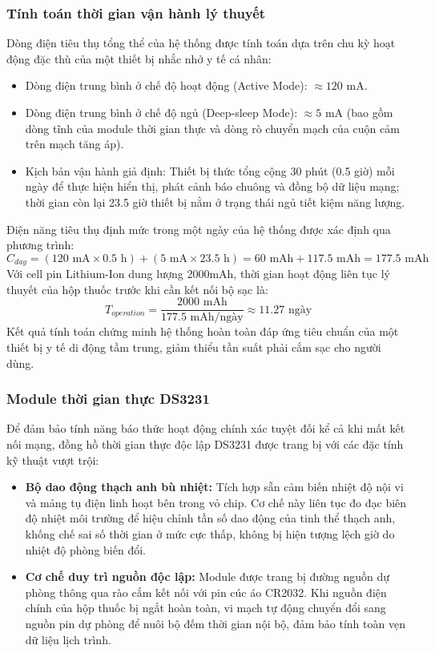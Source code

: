 \documentclass[12pt, a4paper, oneside]{article}
\begin{document}
\subsubsection{Tính toán thời gian vận hành lý thuyết}
Dòng điện tiêu thụ tổng thể của hệ thống được tính toán dựa trên chu kỳ hoạt động đặc thù của một thiết bị nhắc nhở y tế cá nhân:
\begin{itemize}
    \item Dòng điện trung bình ở chế độ hoạt động (Active Mode): $\approx 120$ mA.
    \item Dòng điện trung bình ở chế độ ngủ (Deep-sleep Mode): $\approx 5$ mA (bao gồm dòng tĩnh của module thời gian thực và dòng rò chuyển mạch của cuộn cảm trên mạch tăng áp).
    \item Kịch bản vận hành giả định: Thiết bị thức tổng cộng 30 phút (0.5 giờ) mỗi ngày để thực hiện hiển thị, phát cảnh báo chuông và đồng bộ dữ liệu mạng; thời gian còn lại 23.5 giờ thiết bị nằm ở trạng thái ngủ tiết kiệm năng lượng.
\end{itemize}
Điện năng tiêu thụ định mức trong một ngày của hệ thống được xác định qua phương trình:
\begin{equation}
    C_{day} = (120\text{ mA} \times 0.5\text{ h}) + (5\text{ mA} \times 23.5\text{ h}) = 60\text{ mAh} + 117.5\text{ mAh} = 177.5\text{ mAh}
\end{equation}
Với cell pin Lithium-Ion dung lượng 2000mAh, thời gian hoạt động liên tục lý thuyết của hộp thuốc trước khi cần kết nối bộ sạc là:
\begin{equation}
    T_{operation} = \frac{2000\text{ mAh}}{177.5\text{ mAh/ngày}} \approx 11.27\text{ ngày}
\end{equation}
Kết quả tính toán chứng minh hệ thống hoàn toàn đáp ứng tiêu chuẩn của một thiết bị y tế di động tầm trung, giảm thiểu tần suất phải cắm sạc cho người dùng.

\subsubsection{Module thời gian thực DS3231}
Để đảm bảo tính năng báo thức hoạt động chính xác tuyệt đối kể cả khi mất kết nối mạng, đồng hồ thời gian thực độc lập DS3231 được trang bị với các đặc tính kỹ thuật vượt trội:
\begin{itemize}
    \item \textbf{Bộ dao động thạch anh bù nhiệt:} Tích hợp sẵn cảm biến nhiệt độ nội vi và mảng tụ điện linh hoạt bên trong vỏ chip. Cơ chế này liên tục đo đạc biên độ nhiệt môi trường để hiệu chỉnh tần số dao động của tinh thể thạch anh, khống chế sai số thời gian ở mức cực thấp, không bị hiện tượng lệch giờ do nhiệt độ phòng biến đổi.
    \item \textbf{Cơ chế duy trì nguồn độc lập:} Module được trang bị đường nguồn dự phòng thông qua rào cắm kết nối với pin cúc áo CR2032. Khi nguồn điện chính của hộp thuốc bị ngắt hoàn toàn, vi mạch tự động chuyển đổi sang nguồn pin dự phòng để nuôi bộ đếm thời gian nội bộ, đảm bảo tính toàn vẹn dữ liệu lịch trình.
\end{itemize}
\end{document}
